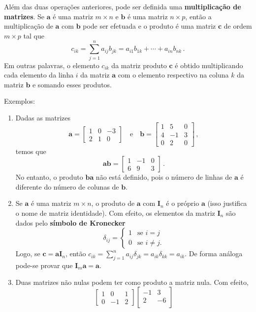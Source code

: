 \documentclass[12pt,a4paper]{report}
\newcommand{\tb}{\textbf}
\newcommand{\mb}{\mathbf}
\begin{document}
Além das duas operações anteriores, pode ser definida uma \tb{multiplicação de matrizes}. Se $\mb a$ é uma matriz $m\times n$ e $\mb b$ é uma matriz $n\times p$, então a multiplicação de $\mb a$ com $\mb b$ pode ser efetuada e o produto é uma matriz $\mb c$ de ordem $m\times p$ tal que
$$c_{ik}=\sum_{j=1}^na_{ij}b_{jk}=a_{i1}b_{1k}+\cdots+a_{in}b_{nk}\,.$$
Em outras palavras, o elemento $c_{ik}$ da matriz produto $\mb c$ é obtido multiplicando cada elemento da linha $i$ da matriz $\mb a$ com o elemento respectivo na coluna $k$ da matriz $\mb b$ e somando esses produtos.

Exemplos:
\begin{enumerate}
  \item Dadas as matrizes
  $$\mb a=\begin{bmatrix}
    1&0&-3\\
    2&1&0
  \end{bmatrix}\quad\text{e}\quad\mb b=\begin{bmatrix}
    1&5&0\\
    4&-1&3\\
    0&2&0
  \end{bmatrix}\,,$$
  temos que
  $$\mb {ab}=\begin{bmatrix}
    1&-1&0\\
    6&9&3
  \end{bmatrix}\,.$$
  No entanto, o produto $\mb{ba}$ não está definido, pois o número de linhas de $\mb a$ é diferente do número de colunas de $\mb b$.
  \item Se $\mb a$ é uma matriz $m\times n$, o produto de $\mb a$ com $\mb I_n$ é o próprio $\mb a$ (isso justifica o nome de matriz identidade). Com efeito, os elementos da matriz $\mb I_n$ são dados pelo \tb{símbolo de Kronecker}
  $$\delta_{ij}=\begin{cases}
    1&\text{se $i=j$}\\
    0&\text{se $i\ne j$.}
  \end{cases}$$
  Logo, se $\mb c=\mb {aI}_n$, então $c_{ik}=\sum_{j=1}^na_{ij}\delta_{jk}=a_{ik}\delta_{kk}=a_{ik}$. De forma análoga pode-se provar que $\mb I_m\mb a=\mb a$.
  \item Duas matrizes não nulas podem ter como produto a matriz nula. Com efeito,
  $$\begin{bmatrix}
    1&0&1\\
    0&-1&2
  \end{bmatrix}\begin{bmatrix}
    -1&3\\
    2&-6\\

\end{bmatrix}$$
\end{enumerate}
\end{document}
